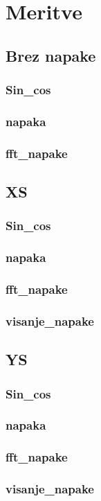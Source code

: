 \chapter{Meritve}
\section{Brez napake}
\subsection{Sin\_cos}
\subsection{napaka}
\subsection{fft\_napake}
\section{XS}
\subsection{Sin\_cos}
\subsection{napaka}
\subsection{fft\_napake}
\subsection{visanje\_napake}

\section{YS}
\subsection{Sin\_cos}
\subsection{napaka}
\subsection{fft\_napake}
\subsection{visanje\_napake}

